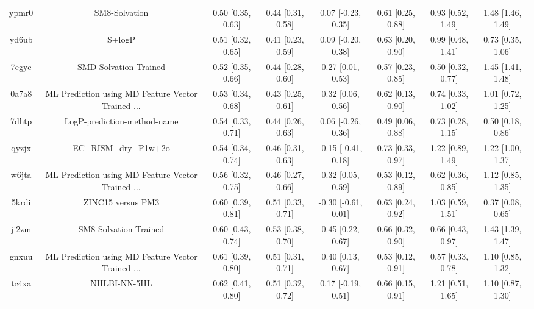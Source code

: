 \documentclass{article}
\begin{document}
\begin{center}
\begin{longtable}{|cccccccc|}
 ypmr0 &                                      SM8-Solvation &  0.50 [0.35, 0.63] &  0.44 [0.31, 0.58] &    0.07 [-0.23, 0.35] &  0.61 [0.25, 0.88] &    0.93 [0.52, 1.49] &     1.48 [1.46, 1.49] \\
 yd6ub &                                             S+logP &  0.51 [0.32, 0.65] &  0.41 [0.23, 0.59] &    0.09 [-0.20, 0.38] &  0.63 [0.20, 0.90] &    0.99 [0.48, 1.41] &     0.73 [0.35, 1.06] \\
 7egyc &                              SMD-Solvation-Trained &  0.52 [0.35, 0.66] &  0.44 [0.28, 0.60] &     0.27 [0.01, 0.53] &  0.57 [0.23, 0.85] &    0.50 [0.32, 0.77] &     1.45 [1.41, 1.48] \\
 0a7a8 &  ML Prediction using MD Feature Vector Trained ... &  0.53 [0.34, 0.68] &  0.43 [0.25, 0.61] &     0.32 [0.06, 0.56] &  0.62 [0.13, 0.90] &    0.74 [0.33, 1.02] &     1.01 [0.72, 1.25] \\
 7dhtp &                        LogP-prediction-method-name &  0.54 [0.33, 0.71] &  0.44 [0.26, 0.63] &    0.06 [-0.26, 0.36] &  0.49 [0.06, 0.88] &    0.73 [0.28, 1.15] &     0.50 [0.18, 0.86] \\
 qyzjx &                              EC\_RISM\_dry\_P1w+2o &  0.54 [0.34, 0.74] &  0.46 [0.31, 0.63] &   -0.15 [-0.41, 0.18] &  0.73 [0.33, 0.97] &    1.22 [0.89, 1.49] &     1.22 [1.00, 1.37] \\
 w6jta &  ML Prediction using MD Feature Vector Trained ... &  0.56 [0.32, 0.75] &  0.46 [0.27, 0.66] &     0.32 [0.05, 0.59] &  0.53 [0.12, 0.89] &    0.62 [0.36, 0.85] &     1.12 [0.85, 1.35] \\
 5krdi &                                  ZINC15 versus PM3 &  0.60 [0.39, 0.81] &  0.51 [0.33, 0.71] &   -0.30 [-0.61, 0.01] &  0.63 [0.24, 0.92] &    1.03 [0.59, 1.51] &     0.37 [0.08, 0.65] \\
 ji2zm &                              SM8-Solvation-Trained &  0.60 [0.43, 0.74] &  0.53 [0.38, 0.70] &     0.45 [0.22, 0.67] &  0.66 [0.32, 0.90] &    0.66 [0.43, 0.97] &     1.43 [1.39, 1.47] \\
 gnxuu &  ML Prediction using MD Feature Vector Trained ... &  0.61 [0.39, 0.80] &  0.51 [0.31, 0.71] &     0.40 [0.13, 0.67] &  0.53 [0.12, 0.91] &    0.57 [0.33, 0.78] &     1.10 [0.85, 1.32] \\
 tc4xa &                                       NHLBI-NN-5HL &  0.62 [0.41, 0.80] &  0.51 [0.32, 0.72] &    0.17 [-0.19, 0.51] &  0.66 [0.15, 0.91] &    1.21 [0.51, 1.65] &     1.10 [0.87, 1.30] \\

\end{longtable}
\end{center}
\end{document}

